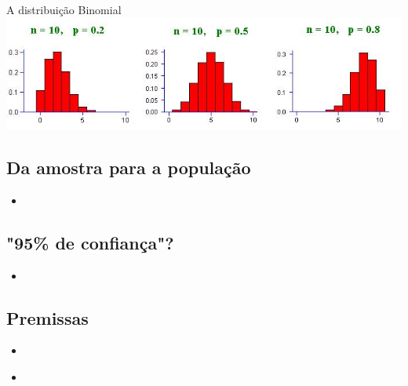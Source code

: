 \documentclass{beamer}
\begin{document}
\begin{frame}{A distribuição Binomial}
\includegraphics[width=\textwidth]{Prob_II/binomial}
\end{frame}

\subsection{Da amostra para a população}

\begin{frame}
  \begin{itemize}
  \item 
  \end{itemize}
\end{frame}

\subsection{"95\% de confiança"?}

\begin{frame}
  \begin{itemize}
  \item 
  \end{itemize}
\end{frame}

\subsection{Premissas}

\begin{frame}
  \begin{itemize}
  \item 
  \end{itemize}
\end{frame}

\begin{frame}
  \begin{itemize}
  \item 
  \end{itemize}
\end{frame}
\end{document}
